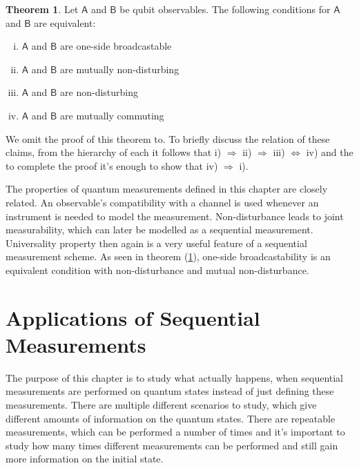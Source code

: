 \documentclass[a4paper,12pt]{wihuri}
\theoremstyle{definition}
\newtheorem{theorem}{Theorem}
\numberwithin{definition}{section}
\numberwithin{example}{section}
\numberwithin{theorem}{section}
\numberwithin{proposition}{section}
\numberwithin{lemma}{section}
\newcommand{\A}{\mathsf{A}}%
\newcommand{\B}{\mathsf{B}}%
\begin{document}
\begin{theorem}\label{qubit_broadcasting}
Let $\A$ and $\B$ be qubit observables. The following conditions for $\A$ and $\B$ are equivalent:
\begin{enumerate}[i)]
\item $\A$ and $\B$ are one-side broadcastable
\item $\A$ and $\B$ are mutually non-disturbing
\item $\A$ and $\B$ are non-disturbing
\item $\A$ and $\B$ are mutually commuting
\end{enumerate}
\end{theorem}
We omit the proof of this theorem to\cite{heinosaari_simultaneous}. To briefly discuss the relation of these claims, from the hierarchy of each it follows that i) $\Rightarrow$ ii) $\Rightarrow$ iii) $\Leftrightarrow$ iv) and the to complete the proof it's enough to show that iv) $\Rightarrow$ i)\cite{heinosaari_simultaneous}.

The properties of quantum measurements defined in this chapter are closely related. An observable's compatibility with a channel is used whenever an instrument is needed to model the measurement. Non-disturbance leads to joint measurability, which can later be modelled as a sequential measurement. Universality property then again is a very useful feature of a sequential measurement scheme. As seen in theorem (\ref{qubit_broadcasting}), one-side broadcastability is an equivalent condition with non-disturbance and mutual non-disturbance. 



\section{Applications of Sequential Measurements}
The purpose of this chapter is to study what actually happens, when sequential measurements are performed on quantum states instead of just defining these measurements. There are multiple different scenarios to study, which give different amounts of information on the quantum states. There are repeatable measurements, which can be performed a number of times and it's important to study how many times different measurements can be performed and still gain more information on the initial state. 
\end{document}
